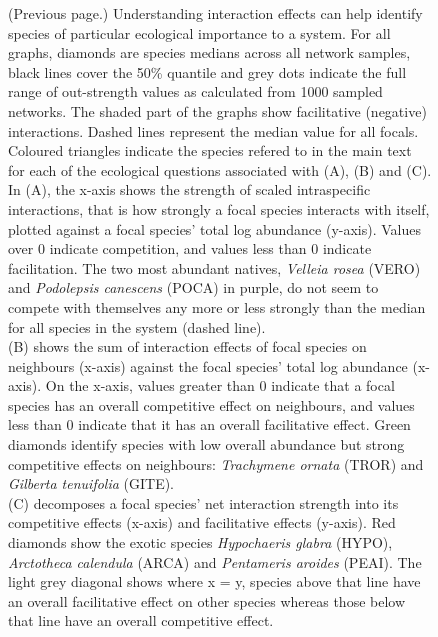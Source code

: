 \documentclass[a4,12pt]{article}
\begin{document}
    \addtocounter{figure}{-1}
    \begin{figure} [t!]
        \caption{(Previous page.) Understanding interaction effects can help identify species of particular ecological importance to a system. For all graphs, diamonds are species medians across all network samples, black lines cover the 50\% quantile and grey dots indicate the full range of out-strength values as calculated from 1000 sampled networks. The shaded part of the graphs show facilitative (negative) interactions. Dashed lines represent the median value for all focals. Coloured triangles indicate the species refered to in the main text for each of the ecological questions associated with (A), (B) and (C). \\
        In (A), the x-axis shows the strength of scaled intraspecific interactions, that is how strongly a focal species interacts with itself, plotted against a focal species' total log abundance (y-axis). Values over $0$ indicate competition, and values less than $0$ indicate facilitation.  The two most abundant natives, \textit{Velleia rosea} (VERO) and \textit{Podolepsis canescens} (POCA) in purple, do not seem to compete with themselves any more or less strongly than the median for all species in the system (dashed line). \\
        (B) shows the sum of interaction effects of focal species on neighbours (x-axis) against the focal species' total log abundance (x-axis). On the x-axis, values greater than $0$ indicate that a focal species has an overall competitive effect on neighbours, and values less than $0$ indicate that it has an overall facilitative effect. Green diamonds identify species with low overall abundance but strong competitive effects on neighbours: \textit{Trachymene ornata} (TROR) and \textit{Gilberta tenuifolia} (GITE). \\
        (C) decomposes a focal species' net interaction strength into its competitive effects (x-axis) and facilitative effects (y-axis). Red diamonds show the exotic species \textit{Hypochaeris glabra} (HYPO), \textit{Arctotheca calendula} (ARCA) and \textit{Pentameris aroides} (PEAI). The light grey diagonal shows where x = y, species above that line have an overall facilitative effect on other species whereas those below that line have an overall competitive effect.} 
    \end{figure}

\clearpage
\newpage
\end{document}
